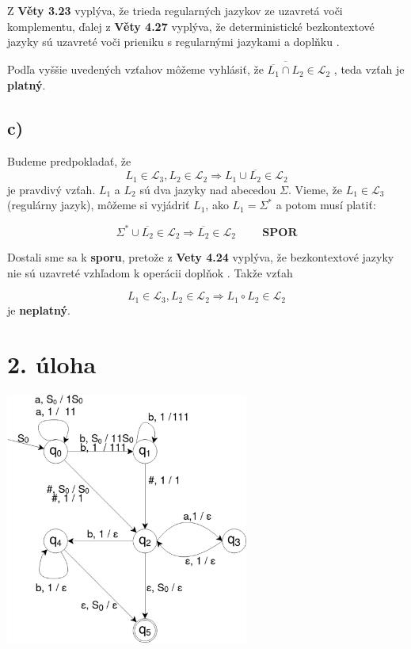 \documentclass[11pt,a4paper]{article}
\begin{document}
Z \textbf{Věty 3.23} vyplýva, že trieda regularných jazykov ze uzavretá voči komplementu, ďalej z \textbf{Věty 4.27} vyplýva, že deterministické bezkontextové jazyky sú uzavreté voči prieniku s regularnými jazykami a doplňku \cite{AA}.


Podľa vyššie uvedených vzťahov môžeme vyhlásiť, že $\overline{\overline{L_1} \cap L_2} \in \mathcal{L}_2$ , teda vzťah je \textbf{platný}.










\subsection{c)}

Budeme predpokladať, že
\begin{equation}
    L_1 \in \mathcal{L}_3, L_2 \in \mathcal{L}_2 \Rightarrow L_1 \cup \overline{L_2} \in \mathcal{L}_2
\end{equation}
je pravdivý vzťah. $L_1$ a $L_2$ sú dva jazyky nad abecedou $\Sigma$. Vieme, že $L_1 \in \mathcal{L}_3$(regulárny jazyk), môžeme si vyjádriť $L_1$, ako $L_1 = \Sigma^*$ a potom musí platiť:

\begin{equation}
\Sigma^* \cup \overline{L_2} \in \mathcal{L}_2 \Rightarrow \overline{L_2} \in \mathcal{L}_2 \hspace{1cm}\textbf{SPOR}
\end{equation}

Dostali sme sa k \textbf{sporu}, pretože z \textbf{Vety 4.24} vyplýva, že bezkontextové jazyky nie sú uzavreté vzhľadom k operácii doplňok \cite{AA}. Takže vzťah

\begin{equation}
L_1 \in \mathcal{L}_3, L_2 \in \mathcal{L}_2 \Rightarrow L_1 \circ L_2 \in \mathcal{L}_2
\end{equation}
je \textbf{neplatný}.

\newpage
\section{2. úloha}

\begin{center}
    \includegraphics[width=0.6\textwidth]{QFSMpng.eps}
\end{center}
\end{document}
